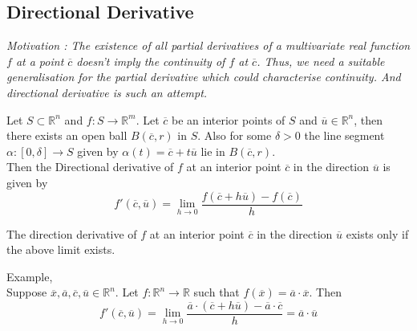 \subsection{Directional Derivative}
	\textsl{Motivation : The existence of all partial derivatives of a multivariate real function $f$ at a point $\overline{c}$ doesn't imply the continuity of $f$ at $\overline{c}$. Thus, we need a suitable generalisation for the partial derivative which could characterise continuity. And directional derivative is such an attempt.}

\begin{definition}
	Let \(S \subset \mathbb{R}^n\) and \(f : S \to \mathbb{R}^m\). Let $\overline{c}$ be an interior points of $S$ and \( \overline{u} \in \mathbb{R}^n \), then there exists an open ball $B(\overline{c},r)$ in $S$. Also for some $\delta > 0$ the line segment \( \alpha : [0,\delta] \to S \) given by \( \alpha(t) = \overline{c}+t\overline{u} \) lie in $B(\overline{c},r)$.\\
	
	Then the Directional derivative of $f$ at an interior point $\overline{c}$ in the direction $\overline{u}$ is given by
	\[ f'(\overline{c},\overline{u}) = \lim_{h \to 0} \frac{f(\overline{c}+h\overline{u}) - f(\overline{c})}{h} \]
\end{definition}

\begin{remark}
	The direction derivative of $f$ at an interior point $\overline{c}$ in the direction $\overline{u}$ exists only if the above limit exists.
\end{remark}

\begin{remark}Example, \cite[Exercise 12.2a]{apostol}\\
	Suppose \(\overline{x},\overline{a},\overline{c},\overline{u} \in \mathbb{R}^n\). Let \(f : \mathbb{R}^n \to \mathbb{R}\) such that \(f(\overline{x}) = \overline{a}\cdot\overline{x}\). Then
	\[ f'(\overline{c},\overline{u}) = \lim_{h \to 0} \frac{\overline{a}\cdot(\overline{c}+h\overline{u}) - \overline{a}\cdot\overline{c}}{h} = \overline{a}\cdot\overline{u}\]
\end{remark}


